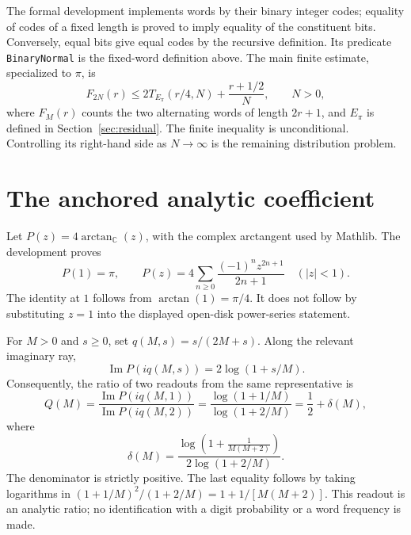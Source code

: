 \documentclass[11pt,a4paper]{article}
\theoremstyle{definition}
\theoremstyle{remark}
\newcommand{\C}{\mathbb C}
\newcommand{\code}[1]{{\small\nolinkurl{#1}}}
\begin{document}
The formal development implements words by their binary integer codes;
equality of codes of a fixed length is proved to imply equality of
the constituent bits. Conversely, equal bits give equal codes by the
recursive definition. Its predicate \code{BinaryNormal} is the
fixed-word definition above. The main finite estimate, specialized to
$\pi$, is
\begin{equation}
 F_{2N}(r)\le
 2T_{E_\pi}(r/4,N)+\frac{r+1/2}{N},\qquad N>0,
 \label{eq:mainpreview}
\end{equation}
where $F_M(r)$ counts the two alternating words of length $2r+1$,
and $E_\pi$ is defined in Section~\ref{sec:residual}.
The finite inequality is unconditional. Controlling its right-hand side
as $N\to\infty$ is the remaining distribution problem.

\section{The anchored analytic coefficient}
\label{sec:coefficient}

Let $P(z)=4\arctan_{\C}(z)$, with the complex arctangent used by Mathlib.
The development proves
\begin{equation}
 P(1)=\pi,\qquad
 P(z)=4\sum_{n\ge0}\frac{(-1)^n z^{2n+1}}{2n+1}
 \quad (|z|<1).
 \label{eq:anchor}
\end{equation}
The identity at $1$ follows from $\arctan(1)=\pi/4$.
It does not follow by substituting $z=1$ into the displayed
open-disk power-series statement.

For $M>0$ and $s\ge0$, set $q(M,s)=s/(2M+s)$. Along the relevant
imaginary ray,
\[
 \operatorname{Im}P(iq(M,s))=2\log(1+s/M).
\]
Consequently, the ratio of two readouts from the same representative is
\begin{equation}
 Q(M)=\frac{\operatorname{Im}P(iq(M,1))}
              {\operatorname{Im}P(iq(M,2))}
      =\frac{\log(1+1/M)}{\log(1+2/M)}
      =\frac12+\delta(M),
 \label{eq:split}
\end{equation}
where
\begin{equation}
 \delta(M)=
 \frac{\log\!\left(1+\frac1{M(M+2)}\right)}
      {2\log(1+2/M)}.
 \label{eq:delta}
\end{equation}
The denominator is strictly positive. The last equality follows by
taking logarithms in
$(1+1/M)^2/(1+2/M)=1+1/[M(M+2)]$.
This readout is an analytic ratio; no identification with a digit
probability or a word frequency is made.
\end{document}
